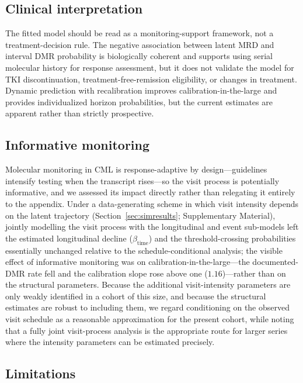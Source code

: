 \documentclass[11pt]{article}
\begin{document}
\subsection{Clinical interpretation}

The fitted model should be read as a monitoring-support framework, not a
treatment-decision rule. The negative association between latent MRD and
interval DMR probability is biologically coherent and supports using
serial molecular history for response assessment, but it does not validate
the model for TKI discontinuation, treatment-free-remission eligibility,
or changes in treatment. Dynamic prediction with recalibration improves
calibration-in-the-large and provides individualized horizon
probabilities, but the current estimates are apparent rather than strictly
prospective.

\subsection{Informative monitoring}

Molecular monitoring in CML is response-adaptive by design---guidelines
intensify testing when the transcript rises---so the visit process is
potentially informative, and we assessed its impact directly rather than
relegating it entirely to the appendix. Under a data-generating scheme in which
visit intensity depends on the latent trajectory
(Section~\ref{sec:simresults}; Supplementary Material), jointly modelling the
visit process with the longitudinal and event sub-models left the estimated
longitudinal decline ($\beta_{\mathrm{time}}$) and the threshold-crossing
probabilities essentially unchanged relative to the schedule-conditional
analysis; the visible effect of informative monitoring was on
calibration-in-the-large---the documented-DMR rate fell and the calibration
slope rose above one ($1.16$)---rather than on the structural parameters.
Because the additional visit-intensity parameters are only weakly identified in
a cohort of this size, and because the structural estimates are robust to
including them, we regard conditioning on the observed visit schedule as a
reasonable approximation for the present cohort, while noting that a fully
joint visit-process analysis is the appropriate route for larger series where
the intensity parameters can be estimated precisely.

\subsection{Limitations}
\end{document}

